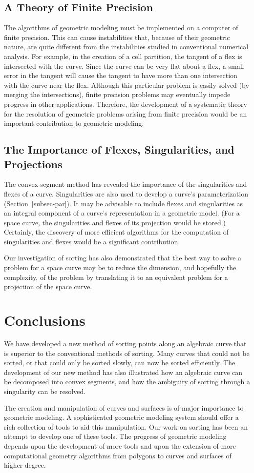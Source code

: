 \subsection{A Theory of Finite Precision}

The algorithms of geometric modeling must be implemented on a
computer of finite precision.
This can cause instabilities that, because of their geometric nature,
are quite different from the instabilities studied in conventional 
numerical analysis.
For example, in the creation of a cell partition, the tangent of a flex 
is intersected with the curve.
Since the curve can be very flat about a flex, a small error 
in the tangent will cause the tangent to have more than one intersection
with the curve near the flex.
Although this particular problem is easily solved (by merging the
intersections), finite precision
problems may eventually impede progress in other
applications.
Therefore, the development of a systematic theory for the resolution of
geometric problems arising from finite precision would be an important
contribution to geometric modeling.
\subsection{The Importance of Flexes, Singularities, and Projections}

The convex-segment method has revealed the importance of the
singularities and flexes of a curve.
Singularities are also used to develop a curve's parameterization 
(Section~\ref{subsec-par}).
It may be advisable to include flexes and singularities
as an integral component of a curve's representation 
in a geometric model.
(For 
a space curve, the singularities and flexes of its projection would be
stored.)
Certainly, the discovery of more efficient algorithms for the computation
of singularities and flexes would be a significant contribution.

Our investigation of sorting has also demonstrated that
the best way to solve a problem for a space curve may be to reduce the
dimension, and hopefully the complexity, of the problem by translating
it to an equivalent problem for a projection of the space curve.
%
\section{Conclusions}
We have developed a new method of sorting points along an algebraic curve
that is superior to the conventional methods of sorting.
Many curves that could not be sorted, or that could only be sorted slowly,
can now be sorted efficiently.
The development of our new method has also
illustrated how an algebraic curve can 
be decomposed into convex segments, and how the
ambiguity of sorting through a singularity can be resolved.

The creation and manipulation of curves and surfaces is of major 
importance to geometric modeling.
A sophisticated geometric modeling system should offer 
a rich collection of tools to aid this manipulation.
Our work on sorting has been an attempt to develop one of these tools.
The progress of geometric modeling depends upon the development of more
tools and upon the extension of more
computational geometry algorithms from polygons to curves and surfaces
of higher degree.
